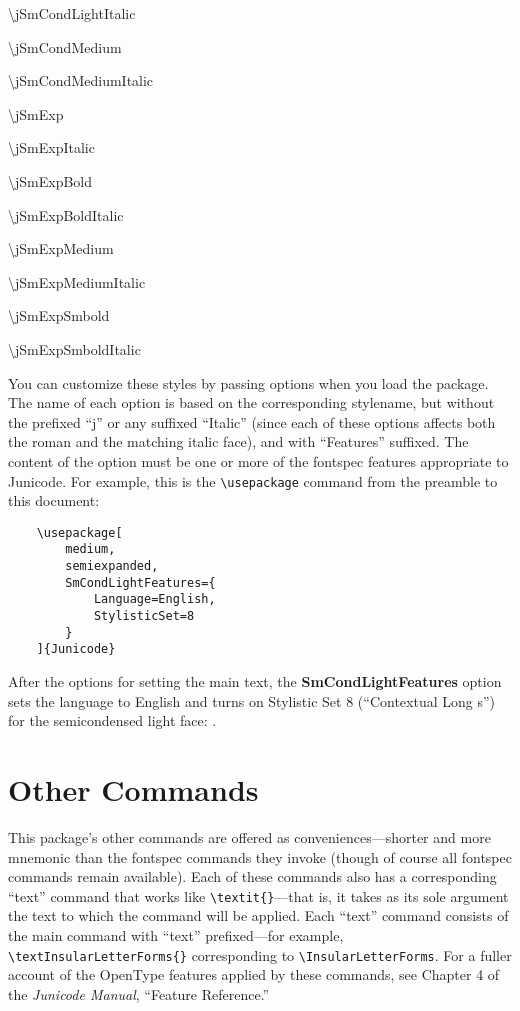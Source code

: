 \documentclass{article}
\newcommand{\fspec}{{\sffamily fontspec}}
\begin{document}
\begin{multicols}{3}
    \textbackslash jSmCondLightItalic
    
    \textbackslash jSmCondMedium
    
    \textbackslash jSmCondMediumItalic
    
    \textbackslash jSmExp
    
    \textbackslash jSmExpItalic
    
    \textbackslash jSmExpBold
    
    \textbackslash jSmExpBoldItalic
    
    \textbackslash jSmExpMedium
    
    \textbackslash jSmExpMediumItalic
    
    \textbackslash jSmExpSmbold
    
    \textbackslash jSmExpSmboldItalic
\end{multicols}

\noindent You can customize these styles by passing options when you load the package.
The name of each option is based on the corresponding stylename, but without the
prefixed “j” or any suffixed “Italic” (since each of these options
affects both the roman and the matching italic face), and with “Features” suffixed.
The content of the option must be one or more of the {\fspec} features appropriate to
Junicode. For example, this is the {\verb|\usepackage|} command from the preamble to
this document:

\begin{verbatim}
    \usepackage[
        medium,
        semiexpanded,
        SmCondLightFeatures={
            Language=English,
            StylisticSet=8
        }
    ]{Junicode}
\end{verbatim}

\noindent After the options for setting the main text, the \textbf{SmCondLightFeatures}
option sets the language to English and turns on Stylistic Set 8 (“Contextual Long s”)
for the semicondensed light face:
{\jSmCondLight {}}.

\section{Other Commands}

This package's other commands are offered as conveniences---shorter and more
mnemonic than the {\fspec} commands they invoke (though of course all {\fspec} commands
remain available). Each of these commands
also has a corresponding “text” command that works like 
{\verb|\textit{}|}—that is, it takes
as its sole argument the text to which the command will be applied. Each “text” command
consists of the main command with “text” prefixed—for example,
{\verb|\textInsularLetterForms{}|}
corresponding to {\verb|\InsularLetterForms|}.  For a fuller account of the OpenType features
applied by these commands, see Chapter 4 of the \textit{Junicode Manual}, “Feature Reference.”
\end{document}

